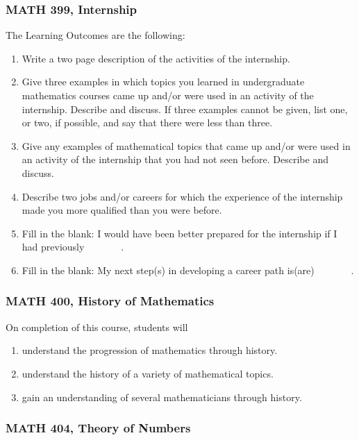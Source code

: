 \documentclass[11pt]{article}
\newenvironment{alphalist}{
\begin{enumerate}[label=(\arabic*),widest=107 ,leftmargin=25pt, itemsep=0pt]}
{\end{enumerate}}
\begin{document}
\subsubsection*{MATH 399, Internship}
The Learning Outcomes are the following:
\begin{alphalist}
    \item Write a two page description of the activities of the 
    internship.
    \item Give three examples in which topics you learned in 
    undergraduate mathematics courses came up and/or were used in an 
    activity of the internship. Describe and discuss. 
    If three examples cannot be given, list one, or two, if possible, 
    and say that there were less than three.
    \item Give any examples of mathematical topics that came up 
    and/or were used in an activity of the internship that you had 
    not seen before. Describe and discuss. 
    \item Describe two jobs and/or careers for which the experience 
    of the internship made you more qualified than you were before.
    \item Fill in the blank: I would have been better prepared for 
    the internship if I had previously \underline{$\phantom{xxxxxx}$}.
    \item Fill in the blank: My next step(s) in developing a career path is(are) 
    \underline{$\phantom{xxxxxx}$}.
\end{alphalist}

\subsubsection*{MATH 400, History of Mathematics}

On completion of this course, students will 
\begin{alphalist}
    \item understand the progression of mathematics through history.
    \item understand the history of a variety of mathematical topics.
    \item gain an understanding of several mathematicians through history.
\end{alphalist}

\subsubsection*{MATH 404, Theory of Numbers}
\end{document}
